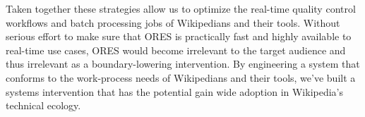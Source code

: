 Taken together these strategies allow us to optimize the real-time quality control workflows and batch processing jobs of Wikipedians and their tools.  Without serious effort to make sure that ORES is practically fast and highly available to real-time use cases, ORES would become irrelevant to the target audience and thus irrelevant as a boundary-lowering intervention.  By engineering a system that conforms to the work-process needs of Wikipedians and their tools, we've built a systems intervention that has the potential gain wide adoption in Wikipedia's technical ecology.
